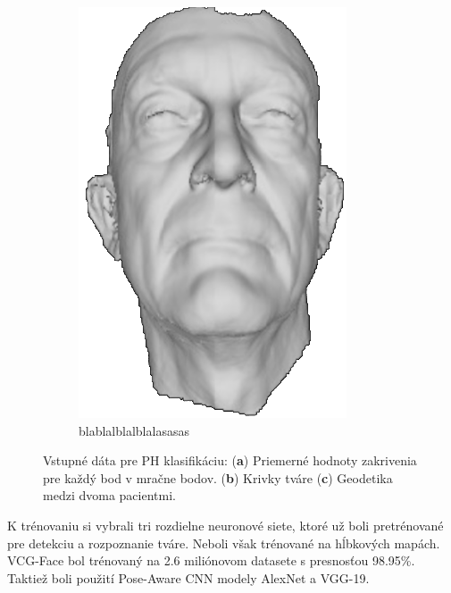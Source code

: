 \begin{figure}[h]
\begin{subfigure}[b]{0.37\textwidth}
		\includegraphics[width=\textwidth]{figures/resers_f.png}
		\caption{blablalblalblalasasas}
		\label{fig:resers:b}
	\end{subfigure}
	\caption{Vstupné dáta pre PH klasifikáciu: (\textbf{a}) Priemerné hodnoty zakrivenia pre každý bod v mračne bodov. 
	(\textbf{b}) Krivky tváre
	(\textbf{c}) Geodetika medzi dvoma pacientmi. }
\label{fig:resers}
\end{figure}

K trénovaniu si vybrali tri rozdielne neuronové siete, ktoré už boli pretrénované pre detekciu a rozpoznanie tváre. Neboli však trénované na hĺbkových mapách.  VCG-Face bol trénovaný na 2.6 miliónovom datasete s presnosťou 98.95\%. Taktiež boli použití Pose-Aware CNN modely AlexNet a VGG-19. 

